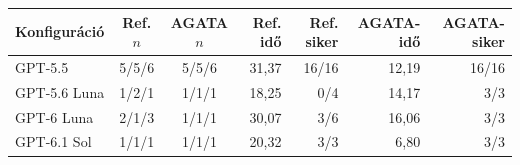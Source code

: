 \setlength{\tabcolsep}{4pt}
\begin{tabularx}{\textwidth}{@{}Xccrrrr@{}}
\toprule
Konfiguráció & Ref. $n$ & AGATA $n$ & Ref. idő & Ref. siker & AGATA-idő & AGATA-siker \\
\midrule
GPT-5.5 & 5/5/6 & 5/5/6 & 31,37 & 16/16 & 12,19 & 16/16 \\
GPT-5.6 Luna & 1/2/1 & 1/1/1 & 18,25 & 0/4 & 14,17 & 3/3 \\
GPT-6 Luna & 2/1/3 & 1/1/1 & 30,07 & 3/6 & 16,06 & 3/3 \\
GPT-6.1 Sol & 1/1/1 & 1/1/1 & 20,32 & 3/3 & 6,80 & 3/3 \\
\bottomrule
\end{tabularx}

